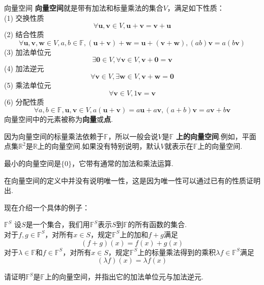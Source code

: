 \documentclass[lang=cn, zihao=5]{elegantbook}
\newcommand{\R}{\mathbb{R}}
\newcommand{\F}{\mathbb{F}}
\begin{document}
\begin{definition}{向量空间}
	\textbf{向量空间}就是带有加法和标量乘法的集合$V$，满足如下性质： \\
	(1) 交换性质$$\forall \boldsymbol{u},\boldsymbol{v} \in V , \boldsymbol{u} + \boldsymbol{v} = \boldsymbol{v} + \boldsymbol{u}$$
	(2) 结合性质$$\forall \boldsymbol{u},\boldsymbol{v},\boldsymbol{w} \in V, a,b \in \F, (\boldsymbol{u} + \boldsymbol{v}) + \boldsymbol{w} = \boldsymbol{u} + (\boldsymbol{v} + \boldsymbol{w}) , (ab) \boldsymbol{v} = a (b\boldsymbol{v})$$
	(3) 加法单位元$$\exists \boldsymbol{0} \in V, \forall \boldsymbol{v} \in V , \boldsymbol{v} + \boldsymbol{0} = \boldsymbol{v}$$
	(4) 加法逆元$$\forall \boldsymbol{v} \in V , \exists \boldsymbol{w} \in V , \boldsymbol{v} + \boldsymbol{w} = \boldsymbol{0}$$
	(5) 乘法单位元$$\forall \boldsymbol{v} \in V , 1\boldsymbol{v} = \boldsymbol{v}$$
	(6) 分配性质$$\forall a,b \in \F , \boldsymbol{u},\boldsymbol{v} \in V , a (\boldsymbol{u} + \boldsymbol{v}) = a\boldsymbol{u} + a\boldsymbol{v} , (a+b)\boldsymbol{v} = a\boldsymbol{v}+b\boldsymbol{v}$$
	向量空间中的元素被称为\textbf{向量}或\textbf{点}.
\end{definition}
\begin{remark}
	因为向量空间的标量乘法依赖于$\F$，所以一般会说$V$是$\F$ \textbf{上的向量空间}.例如，平面点集$\R ^{2}$是$\R$上的向量空间.如果没有特别说明，默认$V$就表示在$\F$上的向量空间.
\end{remark}
\begin{remark}
	最小的向量空间是$\{ 0 \}$，它带有通常的加法和乘法运算.
\end{remark}
\begin{note}
	在向量空间的定义中并没有说明唯一性，这是因为唯一性可以通过已有的性质证明出.
\end{note}

现在介绍一个具体的例子：

\begin{definition}{$\F ^{S}$}
	设$S$是一个集合，我们用$\F ^{S}$表示$S$到$\F$的所有函数的集合. \\
	对于$f,g \in \F ^{S}$，对所有$x \in S$，规定$\F ^{S}$上的加和$f+g$满足$$(f+g)(x) = f(x) + g(x)$$
	对于$\lambda \in \F$和$f \in \F ^{S}$，对所有$x \in S$，规定$\F ^{S}$上的标量乘法得到的乘积$\lambda f \in \F ^{S}$满足$$(\lambda f)(x) = \lambda f(x)$$
\end{definition}

\begin{example}
	请证明$\F ^{S}$是$\F$上的向量空间，并指出它的加法单位元与加法逆元.
\end{example}
\end{document}
